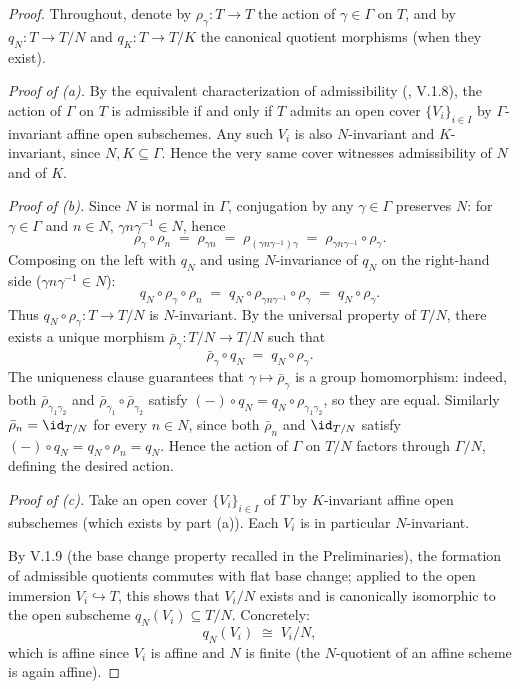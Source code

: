 \begin{proof}
Throughout, denote by $\rho_\gamma : T \to T$ the action of $\gamma \in \Gamma$ on $T$, and by $q_N : T \to T/N$ and $q_K : T \to T/K$ the canonical quotient morphisms (when they exist).

\medskip
\textit{Proof of (a).}
By the equivalent characterization of admissibility (\cite{sga1}, V.1.8), the action of $\Gamma$ on $T$ is admissible if and only if $T$ admits an open cover $\{V_i\}_{i \in I}$ by $\Gamma$-invariant affine open subschemes. Any such $V_i$ is also $N$-invariant and $K$-invariant, since $N, K \subseteq \Gamma$. Hence the very same cover witnesses admissibility of $N$ and of $K$.

\medskip
\textit{Proof of (b).}
Since $N$ is normal in $\Gamma$, conjugation by any $\gamma \in \Gamma$ preserves $N$: for $\gamma \in \Gamma$ and $n \in N$, $\gamma n \gamma^{-1} \in N$, hence
\[
\rho_\gamma \circ \rho_n \;=\; \rho_{\gamma n} \;=\; \rho_{(\gamma n \gamma^{-1}) \gamma} \;=\; \rho_{\gamma n \gamma^{-1}} \circ \rho_\gamma.
\]
Composing on the left with $q_N$ and using $N$-invariance of $q_N$ on the right-hand side ($\gamma n \gamma^{-1} \in N$):
\[
q_N \circ \rho_\gamma \circ \rho_n \;=\; q_N \circ \rho_{\gamma n \gamma^{-1}} \circ \rho_\gamma \;=\; q_N \circ \rho_\gamma.
\]
Thus $q_N \circ \rho_\gamma : T \to T/N$ is $N$-invariant. By the universal property of $T/N$, there exists a unique morphism $\bar\rho_\gamma : T/N \to T/N$ such that
\begin{equation}\label{eq:descent_action}
\bar\rho_\gamma \circ q_N \;=\; q_N \circ \rho_\gamma.
\end{equation}
The uniqueness clause guarantees that $\gamma \mapsto \bar\rho_\gamma$ is a group homomorphism: indeed, both $\bar\rho_{\gamma_1\gamma_2}$ and $\bar\rho_{\gamma_1} \circ \bar\rho_{\gamma_2}$ satisfy $(-) \circ q_N = q_N \circ \rho_{\gamma_1 \gamma_2}$, so they are equal. Similarly $\bar\rho_n = \id_{T/N}$ for every $n \in N$, since both $\bar\rho_n$ and $\id_{T/N}$ satisfy $(-) \circ q_N = q_N \circ \rho_n = q_N$. Hence the action of $\Gamma$ on $T/N$ factors through $\Gamma/N$, defining the desired action.

\medskip
\textit{Proof of (c).}
Take an open cover $\{V_i\}_{i \in I}$ of $T$ by $K$-invariant affine open subschemes (which exists by part (a)). Each $V_i$ is in particular $N$-invariant.

By \cite{sga1} V.1.9 (the base change property recalled in the Preliminaries), the formation of admissible quotients commutes with flat base change; applied to the open immersion $V_i \hookrightarrow T$, this shows that $V_i / N$ exists and is canonically isomorphic to the open subscheme $q_N(V_i) \subseteq T/N$. Concretely:
\[
q_N(V_i) \;\cong\; V_i / N,
\]
which is affine since $V_i$ is affine and $N$ is finite (the $N$-quotient of an affine scheme is again affine).


\end{proof}
